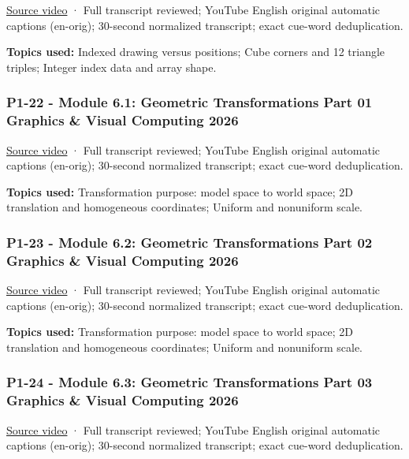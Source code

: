 \href{https://www.youtube.com/watch?v=ztaaLo_SVjQ}{Source video} · Full transcript reviewed; YouTube English original automatic captions (en-orig); 30-second normalized transcript; exact cue-word deduplication.

\textbf{Topics used:} Indexed drawing versus positions; Cube corners and 12 triangle triples; Integer index data and array shape.

\subsubsection{P1-22 - Module 6.1: Geometric Transformations Part 01 Graphics \& Visual Computing 2026}\label{04-visual-computing-ii-ch036-p1-22---module-6.1-geometric-transformations-part-01-graphics-visual-computing-2026}

\href{https://www.youtube.com/watch?v=ynFh7s0SBpg}{Source video} · Full transcript reviewed; YouTube English original automatic captions (en-orig); 30-second normalized transcript; exact cue-word deduplication.

\textbf{Topics used:} Transformation purpose: model space to world space; 2D translation and homogeneous coordinates; Uniform and nonuniform scale.

\subsubsection{P1-23 - Module 6.2: Geometric Transformations Part 02 Graphics \& Visual Computing 2026}\label{04-visual-computing-ii-ch036-p1-23---module-6.2-geometric-transformations-part-02-graphics-visual-computing-2026}

\href{https://www.youtube.com/watch?v=Utop5s8YRM4}{Source video} · Full transcript reviewed; YouTube English original automatic captions (en-orig); 30-second normalized transcript; exact cue-word deduplication.

\textbf{Topics used:} Transformation purpose: model space to world space; 2D translation and homogeneous coordinates; Uniform and nonuniform scale.

\subsubsection{P1-24 - Module 6.3: Geometric Transformations Part 03 Graphics \& Visual Computing 2026}\label{04-visual-computing-ii-ch036-p1-24---module-6.3-geometric-transformations-part-03-graphics-visual-computing-2026}

\href{https://www.youtube.com/watch?v=CeHVh4oSX6g}{Source video} · Full transcript reviewed; YouTube English original automatic captions (en-orig); 30-second normalized transcript; exact cue-word deduplication.

